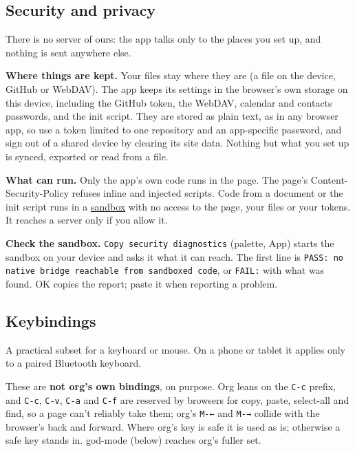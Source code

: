 \documentclass[11pt]{article}
\begin{document}
\subsection{Security and privacy}
\label{sec:orgdd05865}
There is no server of ours: the app talks only to the places you set up, and nothing is sent anywhere else.

\textbf{Where things are kept.} Your files stay where they are (a file on the device, GitHub or WebDAV). The app keeps its settings in the browser's own storage on this device, including the GitHub token, the WebDAV, calendar and contacts passwords, and the init script. They are stored as plain text, as in any browser app, so use a token limited to one repository and an app-specific password, and sign out of a shared device by clearing its site data. Nothing but what you set up is synced, exported or read from a file.

\textbf{What can run.} Only the app's own code runs in the page. The page's Content-Security-Policy refuses inline and injected scripts. Code from a document or the init script runs in a \hyperref[sec:orgd63a52b]{sandbox} with no access to the page, your files or your tokens. It reaches a server only if you allow it.

\textbf{Check the sandbox.} \texttt{Copy security diagnostics} (palette, App) starts the sandbox on your device and asks it what it can reach. The first line is \texttt{PASS: no native bridge reachable from sandboxed code}, or \texttt{FAIL:} with what was found. OK copies the report; paste it when reporting a problem.

\subsection{Keybindings}
\label{sec:orga8a12f7}
A practical subset for a keyboard or mouse. On a phone or tablet it applies only to a paired Bluetooth keyboard.

These are \textbf{not org's own bindings}, on purpose. Org leans on the \texttt{C-c} prefix, and \texttt{C-c}, \texttt{C-v}, \texttt{C-a} and \texttt{C-f} are reserved by browsers for copy, paste, select-all and find, so a page can't reliably take them; org's \texttt{M-←} and \texttt{M-→} collide with the browser's back and forward. Where org's key is safe it is used as is; otherwise a safe key stands in. god-mode (below) reaches org's fuller set.
\end{document}
